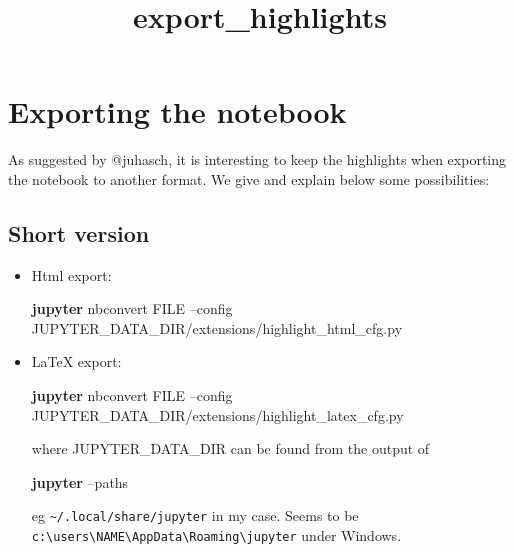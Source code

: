 \documentclass{article}
\title{export\_highlights}
\author{}
\newenvironment{Shaded}{}{}
\newcommand{\KeywordTok}[1]{\textcolor[rgb]{0.00,0.44,0.13}{\textbf{{#1}}}}
\newcommand{\NormalTok}[1]{{#1}}
\begin{document}
    
    
    \maketitle
    
    

    
    \section{Exporting the notebook}\label{exporting-the-notebook}

As suggested by @juhasch, it is interesting to keep the highlights when
exporting the notebook to another format. We give and explain below some
possibilities:

    \subsection{Short version}\label{short-version}

\begin{itemize}
\item
  Html export:

\begin{Shaded}
\begin{Highlighting}[]
 \KeywordTok{jupyter} \NormalTok{nbconvert FILE  --config JUPYTER_DATA_DIR/extensions/highlight_html_cfg.py }
\end{Highlighting}
\end{Shaded}
\item
  LaTeX export:

\begin{Shaded}
\begin{Highlighting}[]
 \KeywordTok{jupyter} \NormalTok{nbconvert FILE  --config JUPYTER_DATA_DIR/extensions/highlight_latex_cfg.py }
\end{Highlighting}
\end{Shaded}

  where JUPYTER\_DATA\_DIR can be found from the output of

\begin{Shaded}
\begin{Highlighting}[]
 \KeywordTok{jupyter} \NormalTok{--paths}
\end{Highlighting}
\end{Shaded}

  eg \texttt{\textasciitilde{}/.local/share/jupyter} in my case. Seems
  to be
  \texttt{c:\textbackslash{}users\textbackslash{}NAME\textbackslash{}AppData\textbackslash{}Roaming\textbackslash{}jupyter}
  under Windows.
\end{itemize}
\end{document}
